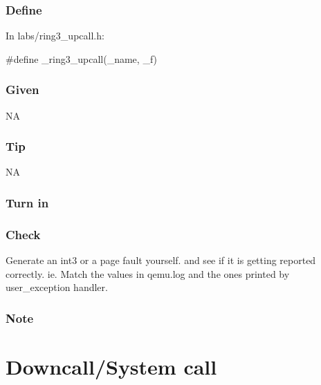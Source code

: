 \documentclass[]{book}
\newenvironment{Shaded}{}{}
\newcommand{\OtherTok}[1]{{#1}}
\begin{document}
\subsubsection*{Define}\label{define-11}

In labs/ring3\_upcall.h:

\begin{Shaded}
\begin{Highlighting}[]
   \OtherTok{#define _ring3_upcall(_name, _f)}
\end{Highlighting}
\end{Shaded}

\subsubsection*{Given}\label{given-11}

NA

\subsubsection*{Tip}\label{tip-11}

NA

\subsubsection*{Turn in}\label{turn-in-11}

\subsubsection*{Check}\label{check-11}

Generate an int3 or a page fault yourself. and see if it is getting
reported correctly. ie. Match the values in qemu.log and the ones
printed by user\_exception handler.

\subsubsection*{Note}\label{note-13}

\section{Downcall/System call}\label{downcallsystem-call}
\end{document}
